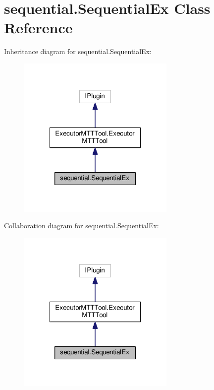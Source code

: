 \hypertarget{classsequential_1_1_sequential_ex}{\section{sequential.\-Sequential\-Ex Class Reference}
\label{classsequential_1_1_sequential_ex}
}


Inheritance diagram for sequential.\-Sequential\-Ex\-:
\nopagebreak
\begin{figure}[H]
\begin{center}
\leavevmode
\includegraphics[width=216pt]{classsequential_1_1_sequential_ex__inherit__graph}
\end{center}
\end{figure}


Collaboration diagram for sequential.\-Sequential\-Ex\-:
\nopagebreak
\begin{figure}[H]
\begin{center}
\leavevmode
\includegraphics[width=216pt]{classsequential_1_1_sequential_ex__coll__graph}
\end{center}
\end{figure}
